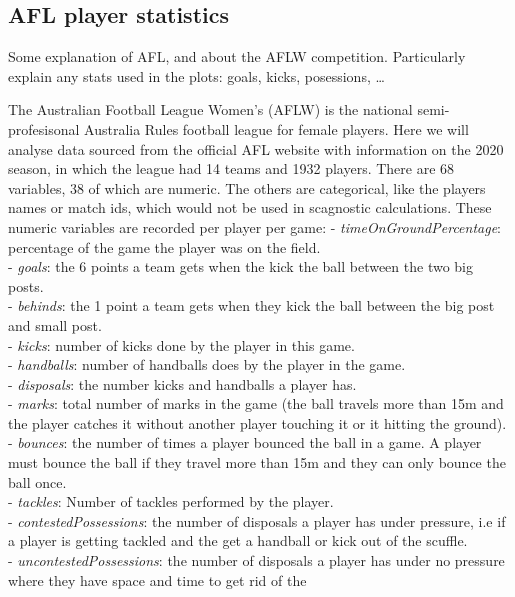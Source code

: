 \hypertarget{afl-player-statistics}{%
\subsection{AFL player statistics}\label{afl-player-statistics}}

Some explanation of AFL, and about the AFLW competition. Particularly
explain any stats used in the plots: goals, kicks, posessions, \ldots{}

The Australian Football League Women's (AFLW) is the national
semi-profesisonal Australia Rules football league for female players.
Here we will analyse data sourced from the official AFL website with
information on the 2020 season, in which the league had 14 teams and
1932 players. There are 68 variables, 38 of which are numeric. The
others are categorical, like the players names or match ids, which would
not be used in scagnostic calculations. These numeric variables are
recorded per player per game: - \emph{timeOnGroundPercentage}:
percentage of the game the player was on the field.\\
- \emph{goals}: the 6 points a team gets when the kick the ball between
the two big posts.\\
- \emph{behinds}: the 1 point a team gets when they kick the ball
between the big post and small post.\\
- \emph{kicks}: number of kicks done by the player in this game.\\
- \emph{handballs}: number of handballs does by the player in the
game.\\
- \emph{disposals}: the number kicks and handballs a player has.\\
- \emph{marks}: total number of marks in the game (the ball travels more
than 15m and the player catches it without another player touching it or
it hitting the ground).\\
- \emph{bounces}: the number of times a player bounced the ball in a
game. A player must bounce the ball if they travel more than 15m and
they can only bounce the ball once.\\
- \emph{tackles}: Number of tackles performed by the player.\\
- \emph{contestedPossessions}: the number of disposals a player has
under pressure, i.e if a player is getting tackled and the get a
handball or kick out of the scuffle.\\
- \emph{uncontestedPossessions}: the number of disposals a player has
under no pressure where they have space and time to get rid of the

